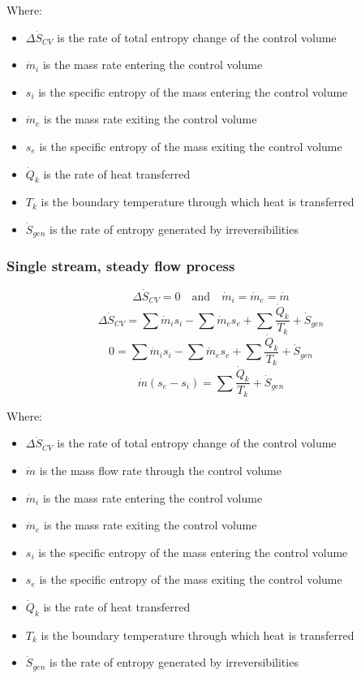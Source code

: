 \documentclass[11pt]{article}
\begin{document}
Where:
\begin{itemize}
\item \(\Delta \dot{S}_{CV}\) is the rate of total entropy change of the control volume
\item \(\dot{m}_i\) is the mass rate entering the control volume
\item \(s_i\) is the specific entropy of the mass entering the control volume
\item \(\dot{m}_e\) is the mass rate exiting the control volume
\item \(s_e\) is the specific entropy of the mass exiting the control volume
\item \(\dot{Q}_k\) is the rate of heat transferred
\item \(T_k\) is the boundary temperature through which heat is transferred
\item \(\dot{S}_{gen}\) is the rate of entropy generated by irreversibilities
\end{itemize}

 \newpage

\subsubsection{Single stream, steady flow process}
\label{sec:org55ad1a5}
\[\Delta \dot{S}_{CV} = 0 \quad \text{and} \quad \dot{m}_i = \dot{m}_e = \dot{m}\]
\[\Delta \dot{S}_{CV} = \sum \dot{m}_i s_i - \sum \dot{m}_e s_e + \sum \frac{\dot{Q}_k}{T_k} + \dot{S}_{gen}\]
\[0 = \sum \dot{m}_i s_i - \sum \dot{m}_e s_e + \sum \frac{\dot{Q}_k}{T_k} + \dot{S}_{gen}\]
\[\dot{m} (s_e - s_i) = \sum \frac{\dot{Q}_k}{T_k} + \dot{S}_{gen}\]

Where:
\begin{itemize}
\item \(\Delta \dot{S}_{CV}\) is the rate of total entropy change of the control volume
\item \(\dot{m}\) is the mass flow rate through the control volume
\item \(\dot{m}_i\) is the mass rate entering the control volume
\item \(\dot{m}_e\) is the mass rate exiting the control volume
\item \(s_i\) is the specific entropy of the mass entering the control volume
\item \(s_e\) is the specific entropy of the mass exiting the control volume
\item \(\dot{Q}_k\) is the rate of heat transferred
\item \(T_k\) is the boundary temperature through which heat is transferred
\item \(\dot{S}_{gen}\) is the rate of entropy generated by irreversibilities
\end{itemize}
\end{document}
